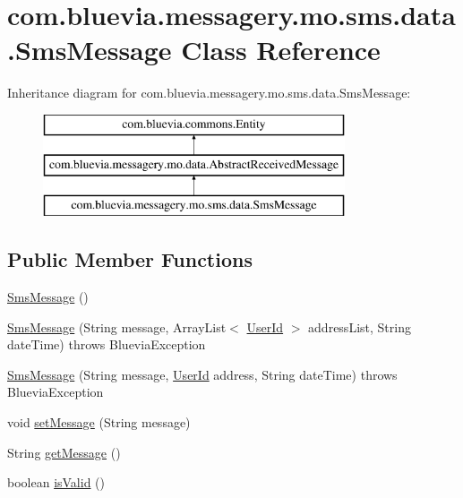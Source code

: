 \hypertarget{classcom_1_1bluevia_1_1messagery_1_1mo_1_1sms_1_1data_1_1SmsMessage}{
\section{com.bluevia.messagery.mo.sms.data.SmsMessage Class Reference}
\label{classcom_1_1bluevia_1_1messagery_1_1mo_1_1sms_1_1data_1_1SmsMessage}
}
Inheritance diagram for com.bluevia.messagery.mo.sms.data.SmsMessage:\begin{figure}[H]
\begin{center}
\leavevmode
\includegraphics[height=3.000000cm]{classcom_1_1bluevia_1_1messagery_1_1mo_1_1sms_1_1data_1_1SmsMessage}
\end{center}
\end{figure}
\subsection*{Public Member Functions}
\begin{DoxyCompactItemize}
\item 
\hyperlink{classcom_1_1bluevia_1_1messagery_1_1mo_1_1sms_1_1data_1_1SmsMessage_a6cb604a2dee076984860853a9fc930bf}{SmsMessage} ()
\item 
\hyperlink{classcom_1_1bluevia_1_1messagery_1_1mo_1_1sms_1_1data_1_1SmsMessage_a41017793cddf985cfe48ef6e699663f8}{SmsMessage} (String message, ArrayList$<$ \hyperlink{classcom_1_1bluevia_1_1commons_1_1data_1_1UserId}{UserId} $>$ addressList, String dateTime)  throws BlueviaException 
\item 
\hyperlink{classcom_1_1bluevia_1_1messagery_1_1mo_1_1sms_1_1data_1_1SmsMessage_a18f92d1e8f48a882a52e29ba0fb885a3}{SmsMessage} (String message, \hyperlink{classcom_1_1bluevia_1_1commons_1_1data_1_1UserId}{UserId} address, String dateTime)  throws BlueviaException 
\item 
void \hyperlink{classcom_1_1bluevia_1_1messagery_1_1mo_1_1sms_1_1data_1_1SmsMessage_ae5862ce0ac9c8ea10b543e7674c1bd75}{setMessage} (String message)
\item 
String \hyperlink{classcom_1_1bluevia_1_1messagery_1_1mo_1_1sms_1_1data_1_1SmsMessage_afacfda0c2ef243315bf42dad818828c2}{getMessage} ()
\item 
boolean \hyperlink{classcom_1_1bluevia_1_1messagery_1_1mo_1_1sms_1_1data_1_1SmsMessage_ae949c68532b88c61c3f92aeabae19983}{isValid} ()
\end{DoxyCompactItemize}


